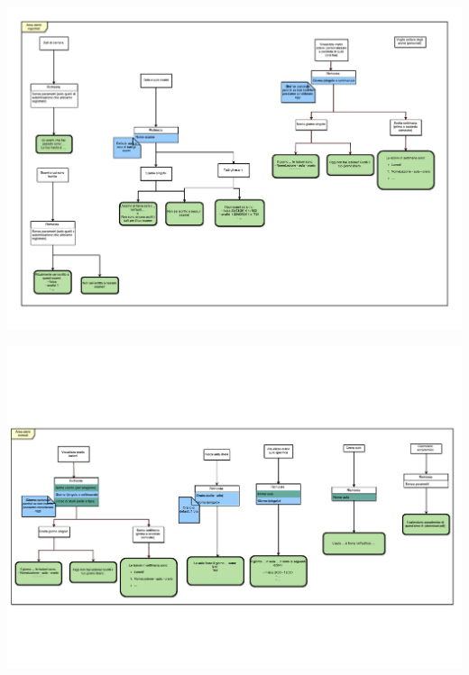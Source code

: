 \documentclass[]{article}
\begin{document}
\vspace*{-3cm}
\hspace*{-2cm} 
\includegraphics[width=2\textwidth, angle =90 ]{p02}
\thispagestyle{empty}


\vspace*{-3cm}
\hspace*{-2cm} 
\includegraphics[width=2\textwidth, angle =90 ]{p03}
\thispagestyle{empty}
\end{document}
